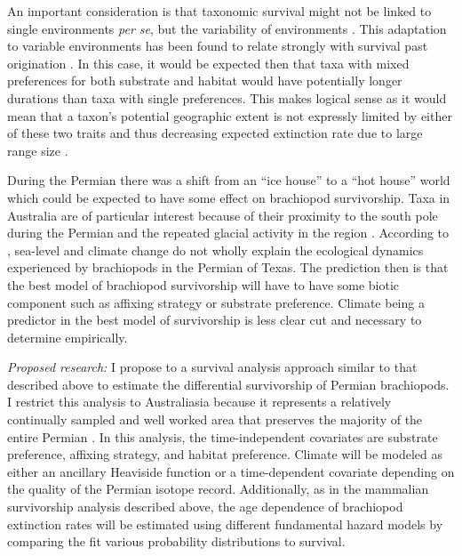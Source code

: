 \documentclass[12pt,letterpaper]{article}
\begin{document}
An important consideration is that taxonomic survival might not be linked to single environments \textit{per se}, but the variability of environments \citep{Foote2013,Heim2011,Liow2007b}. This adaptation to variable environments has been found to relate strongly with survival past origination \citep{Foote2013}. In this case, it would be expected then that taxa with mixed preferences for both substrate and habitat would have potentially longer durations than taxa with single preferences. This makes logical sense as it would mean that a taxon's potential geographic extent is not expressly limited by either of these two traits and thus decreasing expected extinction rate due to large range size \citep{Jablonski1986,Harnik2013,Nurnberg2013a,Jablonski2003,Roy2009c}. 

During the Permian there was a shift from an ``ice house'' to a ``hot house'' world \citep{Fielding2006,Birgenheier2010,Jones2006,Powell2007} which could be expected to have some effect on brachiopod survivorship. Taxa in Australia are of particular interest because of their proximity to the south pole during the Permian and the repeated glacial activity in the region \citep{Fielding2006,Birgenheier2010,Jones2006}. According to \citet{Olszewski2004}, sea-level and climate change do not wholly explain the ecological dynamics experienced by brachiopods in the Permian of Texas. The prediction then is that the best model of brachiopod survivorship will have to have some biotic component such as affixing strategy or substrate preference. Climate being a predictor in the best model of survivorship is less clear cut and necessary to determine empirically.


\textit{Proposed research:}
I propose to a survival analysis approach similar to that described above to estimate the differential survivorship of Permian brachiopods. I restrict this analysis to Australiasia because it represents a relatively continually sampled and well worked area that preserves the majority of the entire Permian \citep{Clapham2012,Clapham2008a,Waterhouse1987,Archbold1995}. In this analysis, the time-independent covariates are substrate preference, affixing strategy, and habitat preference. Climate will be modeled as either an ancillary Heaviside function or a time-dependent covariate depending on the quality of the Permian isotope record. Additionally, as in the mammalian survivorship analysis described above, the age dependence of brachiopod extinction rates will be estimated using different fundamental hazard models by comparing the fit various probability distributions to survival.
\end{document}
